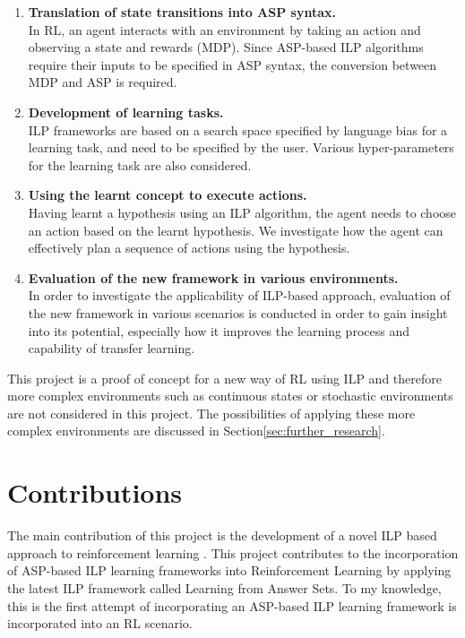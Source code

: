 \newcommand\litem[1]{\item{\bfseries #1.\\}}
\begin{enumerate}
\litem{Translation of state transitions into ASP syntax} 
In RL, an agent interacts with an environment by taking an action and observing a state and rewards (MDP). 
Since ASP-based ILP algorithms require their inputs to be specified in ASP syntax, the conversion between MDP and ASP is required.
\litem{Development of learning tasks} ILP frameworks are based on a search space specified by language bias for a learning task, and need to be specified by the user. 
Various hyper-parameters for the learning task are also considered.
\litem{Using the learnt concept to execute actions}
Having learnt a hypothesis using an ILP algorithm, the agent needs to choose an action based on the learnt hypothesis.
We investigate how the agent can effectively plan a sequence of actions using the hypothesis.
\litem{Evaluation of the new framework in various environments}
In order to investigate the applicability of ILP-based approach, evaluation of the new framework in various scenarios is conducted in order to gain
insight into its potential, especially how it improves the learning process and capability of transfer learning.
\end{enumerate}

This project is a proof of concept for a new way of RL using ILP and therefore more complex environments such as continuous states or stochastic environments are not considered in this project. 
The possibilities of applying these more complex environments are discussed in Section\ref{sec:further_research}.

\section{Contributions}
\label{contributions}
The main contribution of this project is the development of a novel ILP based approach to reinforcement learning .
This project contributes to the incorporation of ASP-based ILP learning frameworks into Reinforcement Learning by applying the latest ILP framework called Learning from Answer Sets. 
To my knowledge, this is the first attempt of incorporating an ASP-based ILP learning framework is incorporated into an RL scenario.

